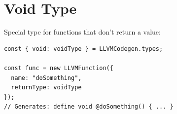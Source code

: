 \section{Void Type}

Special type for functions that don't return a value:

\begin{lstlisting}[style=ts]
const { void: voidType } = LLVMCodegen.types;

const func = new LLVMFunction({
  name: "doSomething",
  returnType: voidType
});
// Generates: define void @doSomething() { ... }
\end{lstlisting}

